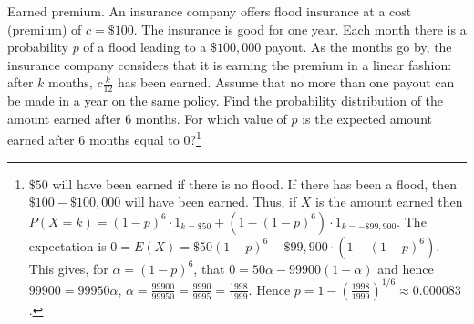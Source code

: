\begin{example}{Earned premium.}\label{drc}
	An insurance company offers flood insurance at a cost (premium) of $c=\$100$.
	The insurance is good for one year. Each month there is a probability $p$ of a flood leading to a $\$100,000$ payout.
	As the months go by, the insurance company considers that it is earning the premium in a linear fashion:
	after $k$ months, $c\frac{k}{12}$ has been earned.
	Assume that no more than one payout can be made in a year on the same policy.
	Find the probability distribution of the amount earned after 6 months.
	For which value of $p$ is the expected amount earned after 6 months equal to 0?\footnote{
		$\$50$ will have been earned if there is no flood.
		If there has been a flood, then $\$100-\$100,000$ will have been earned.
		Thus, if $X$ is the amount earned then
		$P(X=k)=(1-p)^6\cdot 1_{k=\$50} + (1-(1-p)^6)\cdot 1_{k=-\$99,900}$.
		The expectation is $0=E(X)=\$50 (1-p)^6 - \$99,900\cdot (1-(1-p)^6)$.
		This gives, for $\alpha=(1-p)^6$, that $0=50\alpha-99900(1-\alpha)$ and hence
		$99900=99950\alpha$, $\alpha=\frac{99900}{99950}=\frac{9990}{9995}=\frac{1998}{1999}$.
		Hence $p=1-\left(\frac{1998}{1999}\right)^{1/6}\approx 0.000083$.
	}
\end{example}
